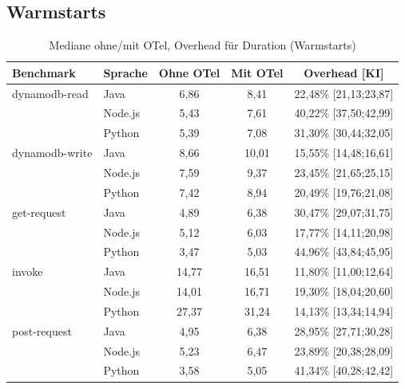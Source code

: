 \subsection{Warmstarts}
\label{app:boot:hot}
\begin{table}[H]
\centering
\footnotesize
\caption{Mediane ohne/mit OTel, Overhead  für Duration (Warmstarts)}
\label{app:boot-abs-duration-hot}
\begin{tabular}{|l|l|c|c|c|}
\hline
\textbf{Benchmark} & \textbf{Sprache} & \textbf{Ohne OTel} & \textbf{Mit OTel} & \textbf{Overhead [KI]} \\
\hline
dynamodb-read   & Java    &   6,86 &   8,41 & 22,48\% [21,13;23,87] \\
                & Node.js &   5,43 &   7,61 & 40,22\% [37,50;42,99] \\
                & Python  &   5,39 &   7,08 & 31,30\% [30,44;32,05] \\
\hline
dynamodb-write  & Java    &   8,66 &  10,01 & 15,55\% [14,48;16,61] \\
                & Node.js &   7,59 &   9,37 & 23,45\% [21,65;25,15] \\
                & Python  &   7,42 &   8,94 & 20,49\% [19,76;21,08] \\
\hline
get-request     & Java    &   4,89 &   6,38 & 30,47\% [29,07;31,75] \\
                & Node.js &   5,12 &   6,03 & 17,77\% [14,11;20,98] \\
                & Python  &   3,47 &   5,03 & 44,96\% [43,84;45,95] \\
\hline
invoke          & Java    &  14,77 &  16,51 & 11,80\% [11,00;12,64] \\
                & Node.js &  14,01 &  16,71 & 19,30\% [18,04;20,60] \\
                & Python  &  27,37 &  31,24 & 14,13\% [13,34;14,94] \\
\hline
post-request    & Java    &   4,95 &   6,38 & 28,95\% [27,71;30,28] \\
                & Node.js &   5,23 &   6,47 & 23,89\% [20,38;28,09] \\
                & Python  &   3,58 &   5,05 & 41,34\% [40,28;42,42] \\
\hline
\end{tabular}
\end{table}

